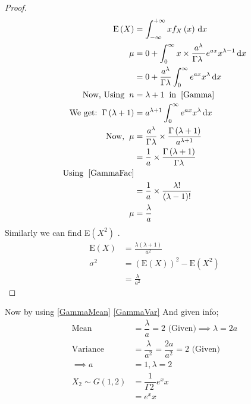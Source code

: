\documentclass[twocolumn]{article}
\newtheorem{proof}[theorem]{Proof}
\providecommand{\brak}[1]{\ensuremath{\left(#1\right)}}
\begin{document}
\begin{proof}
\begin{align}
 \mathrm{E}\brak{X} &= \int_{-\infty}^{+\infty} xf_X\brak{x} \,\mathrm{d}x \\
 \mu &= 0 + \int_{0}^{\infty} x \times \dfrac{a^{\lambda}}{\Gamma{\lambda}\ } e^{ax}x^{\lambda-1} \, \mathrm{d}x \\
 &= 0 + \frac{ a^{\lambda}}{\Gamma \lambda} \int_0^\infty e^{ax}x^{\lambda} \, \mathrm{d}x \\ \label{meanint}
 \text{Now, Using} \hspace{0.2cm} n &= \lambda +1 \hspace{0.2cm} \text{in} \hspace{0.2cm} \eqref{Gamma} \\
 \text{We get:} \hspace{0.2cm} \Gamma \brak{ \lambda +1} &= a^{\lambda +1} \int_0^\infty e^{ax}x^{\lambda} \, \mathrm{d}x \\ \label{Gamma1}
\text{Now,} \hspace{0.2cm}
 \mu &= \frac{a^\lambda}{\Gamma \lambda} \times \frac{\Gamma \brak{\lambda +1}}{ a^{\lambda +1} } \\
 &= \frac{1}{a} \times \frac{\Gamma \brak{\lambda+1}}{ \Gamma \lambda} \\
 \text{Using} \hspace{0.2cm} \eqref{GammaFac} \\
 &= \frac{1}{a} \times \frac{\lambda !}{\brak{\lambda -1 }!} \\
 \mu &= \frac{\lambda}{a} \label{GammaMean}
 \end{align}
Similarly we can find E\brak{X^2} .
\begin{align}
    \mathrm{E}\brak{X} &= \frac{\lambda \brak{\lambda +1}}{ a^2} \\
    \sigma^{2} &= \brak{\mathrm{E}\brak{X}}^2 - \mathrm{E}\brak{X^2} \\
    &=  \frac{\lambda}{a^2} \label{GammaVar}
\end{align}

\end{proof}
Now by using \eqref{GammaMean} \eqref{GammaVar} And given info; \\
\begin{align}
\text{Mean} &= \dfrac{\lambda}{a}=2 \text{ (Given)}
\implies \lambda = 2a \\
\text{Variance} &=  \dfrac{\lambda}{a^2}=\dfrac{2a}{a^2}=2 \text{ (Given)} \\ \implies a &= 1,\lambda=2 \\
X_2\sim G(1,2) &= \dfrac{1}{\Gamma{2}\ } e^{x}x \\
 &= e^{x}x \label{FX2}
\end{align}
\end{document}

